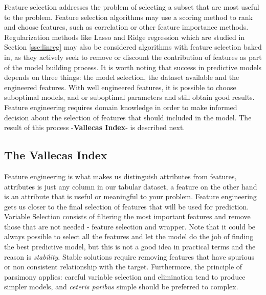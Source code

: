 \documentclass[11pt]{article}
\theoremstyle{definition}
\theoremstyle{remark}
\begin{document}
Feature selection addresses the problem of selecting a subset that are most useful to the problem. Feature selection algorithms may use a scoring method to rank and choose features, such as correlation or other feature importance methods. Regularization methods like Lasso and Ridge regression which are studied in Section \ref{sse:linreg} may also be considered algorithms with feature selection baked in, as they actively seek to remove or discount the contribution of features as part of the model building process. 
It is worth noting that success in predictive models depends on three things: the model selection, the dataset available and the engineered features. With well engineered features, it is possible to choose suboptimal models, and or suboptimal parameters and still obtain good results. Feature engineering requires domain knowledge in order to make informed decision about the selection of features that should included in the model. The result of this process -\textbf{Vallecas Index}- is described next. 


\subsection{The Vallecas Index}
\label{sse:vs}
Feature engineering is what makes us distinguish attributes from features, attributes is just any column in our tabular dataset, a feature on the other hand is an attribute that is useful or meaningful to your problem. Feature engineering gets us closer to the final selection of features that will be used for prediction. 
Variable Selection consists of filtering the most important features and remove those that are not needed - feature selection and wrapper.
Note that it could be always possible to select all the features and let the model do the job of finding the best predictive model, but this is not a good idea in practical terms and the reason is \emph{stability}. Stable solutions require removing features that have spurious or non consistent relationship with the target. Furthermore, the principle of parsimony applies: careful variable selection and elimination tend to produce simpler models, and \emph{ceteris paribus} simple should be preferred to complex.
\end{document}

